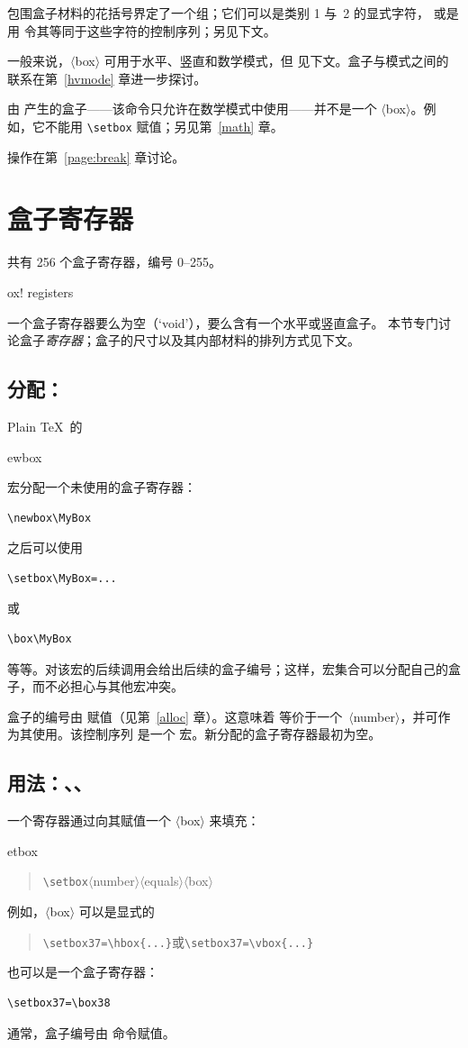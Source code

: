 \documentclass[a4paper]{rapport3}
\makeatletter
\def\gr#1{$\langle$#1$\rangle$}\def\key#1{{\tt#1}}
\newenvironment{Disp}{\begin{quotation}}{\end{quotation}}
\def\term#1\par{\index{#1}}
\def\cstoidx#1\par{\index{#1@\cs{#1}}}
\def\csidx#1{\cstoidx #1\par\cs{#1}}
\makeatother
\begin{document}
包围盒子材料的花括号界定了一个组；它们可以是类别 1 与~2 的显式字符，
或是用  令其等同于这些字符的控制序列；另见下文。


一般来说，\gr{box} 可用于水平、竖直和数学模式，但  见下文。盒子与模式之间的联系在第~\ref{hvmode} 章进一步探讨。

由  产生的盒子——该命令只允许在数学模式中使用——并不是一个 \gr{box}。例如，它不能用 \verb=\setbox= 赋值；另见第~\ref{math} 章。

 操作在第~\ref{page:break} 章讨论。

\section{盒子寄存器}

共有 256 个盒子寄存器，编号 0--255。
\term box! registers\par
一个盒子寄存器要么为空（`void'），要么含有一个水平或竖直盒子。
本节专门讨论盒子\emph{寄存器}；盒子的尺寸以及其内部材料的排列方式见下文。
\awp

\subsection{分配：}

Plain \TeX\ 的 \csidx{newbox} 宏分配一个未使用的盒子寄存器：
\begin{verbatim}
\newbox\MyBox
\end{verbatim}
之后可以使用
\begin{verbatim}
\setbox\MyBox=...
\end{verbatim}
或
\begin{verbatim}
\box\MyBox
\end{verbatim}
等等。对该宏的后续调用会给出后续的盒子编号；这样，宏集合可以分配自己的盒子，而不必担心与其他宏冲突。

盒子的编号由  赋值（见第~\ref{alloc} 章）。这意味着  等价于一个~\gr{number}，并可作为其使用。该控制序列
\altt
{} 是一个  宏。新分配的盒子寄存器最初为空。


\subsection{用法：、、}

一个寄存器通过向其赋值一个 \gr{box} 来填充：
\cstoidx setbox\par
\begin{Disp}\verb>\setbox>\gr{number}\gr{equals}\gr{box}\end{Disp}
例如，\gr{box} 可以是显式的
\begin{Disp}\verb>\setbox37=\hbox{...}>\quad 或\quad \verb>\setbox37=\vbox{...}>
\end{Disp}
也可以是一个盒子寄存器：
\begin{verbatim}
\setbox37=\box38
\end{verbatim}
通常，盒子编号由  命令赋值。
\end{document}
